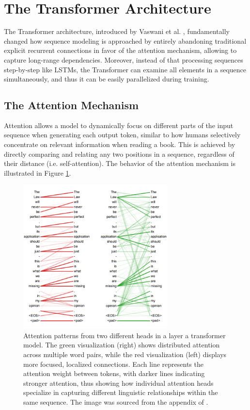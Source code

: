 \section{The Transformer Architecture}  \label{transformer_architecture}

The Transformer architecture, introduced by Vaswani et al. \cite{attention_is_all_you_need}, fundamentally changed how sequence modeling is approached by entirely abandoning traditional explicit recurrent connections in favor of the attention mechanism, allowing to capture long-range dependencies. Moreover, instead of that processing sequences step-by-step like LSTMs, the Transformer can examine all elements in a sequence simultaneously, and thus it can be easily parallelized during training.

\subsection{The Attention Mechanism}

Attention allows a model to dynamically focus on different parts of the input sequence when generating each output token, similar to how humans selectively concentrate on relevant information when reading a book. This is achieved by directly comparing and relating any two positions in a sequence, regardless of their distance (i.e. self-attention). The behavior of the attention mechanism is illustrated in Figure \ref{fig:attention}.

\begin{figure}[!htbp]
\centering
\includegraphics[width=0.7\textwidth]{images/attention.png}
\caption[Visualization of Attention Patterns]{Attention patterns from two different heads in a layer a transformer model. The green visualization (right) shows distributed attention across multiple word pairs, while the red visualization (left) displays more focused, localized connections. Each line represents the attention weight between tokens, with darker lines indicating stronger attention, thus showing how individual attention heads specialize in capturing different linguistic relationships within the same sequence. The image was sourced from the appendix of \cite{attention_is_all_you_need}.}
\label{fig:attention}
\end{figure}

